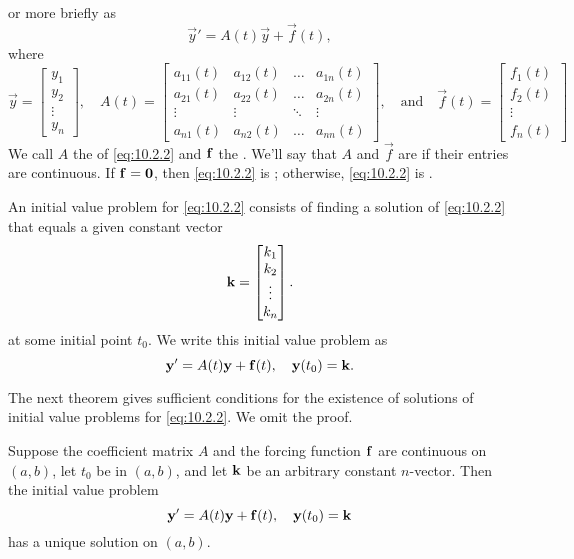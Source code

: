 \documentclass{ximera}
\begin{document}
or more briefly as
\begin{equation} \label{eq:10.2.2}
\vec{y}'=A(t)\vec{y}+\vec{f}(t),
\end{equation}
where
$$
\vec{y}=\begin{bmatrix}y_1\\y_2\\\vdots\\y_n\end{bmatrix},\quad
A(t)=\begin{bmatrix}a_{11}(t)&a_{12}(t)&\dots &a_{1n}(t)\\
a_{21}(t)&a_{22}(t)&\dots &a_{2n}(t)\\
\vdots &\vdots &\ddots &\vdots\\
a_{n1}(t)&a_{n2}(t)&\dots &a_{nn}(t)\end{bmatrix},\quad\mbox{and}\quad\vec{f}(t)=\begin{bmatrix}f_1(t)\\f_2(t)\\\vdots\\f_n(t)\end{bmatrix}
$$
We call $A$  the  of \eqref{eq:10.2.2} and
${\bf f}$  the .   We'll say that $A$
and $\vec{f}$ are  if their entries are continuous.
If ${\bf f}={\bf 0}$, then \eqref{eq:10.2.2} is ;
otherwise, \eqref{eq:10.2.2} is .

An  initial value problem  for \eqref{eq:10.2.2} consists of
finding a solution of \eqref{eq:10.2.2} that equals a given constant
vector
$$
{\bf k} =\begin{bmatrix}k_1\\k_2\\\vdots\\k_n\end{bmatrix}.
$$
at some initial point $t_0$. We write this initial value problem as
$$
{\bf y}'=A(t){\bf y}+{\bf f}(t), \quad  {\bf y}(t_0)={\bf k}.
$$

The next theorem gives sufficient conditions for the existence
of solutions of initial value problems for \eqref{eq:10.2.2}. We omit the
proof.

\begin{theorem}\label{thmtype:10.2.1}
Suppose the coefficient matrix $A$ and the forcing function ${\bf
f}$ are continuous on $(a,b)$, let $t_0$ be in $(a,b)$, and let ${\bf
k}$ be an arbitrary constant $n$-vector. Then the initial value
problem
$$
{\bf y}'=A(t){\bf y}+{\bf f}(t), \quad  {\bf y}(t_0)={\bf k}
$$
 has a unique solution on $(a,b)$.
\end{theorem}
\end{document}
